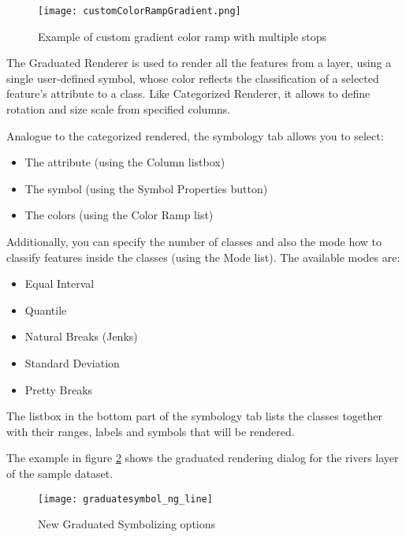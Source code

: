 \begin{figure}[ht]
   \centering
   \caption{Example of custom gradient color ramp with multiple stops \nixcaption}\label{fig:ccrg}
   \texttt{[image: customColorRampGradient.png]}
\end{figure}


The Graduated Renderer is used to render all the features from a layer, using
a single user-defined symbol, whose color reflects the classification of a selected
feature's attribute to a class. Like Categorized Renderer, it allows to define
rotation and size scale from specified columns.

Analogue to the categorized rendered, the symbology tab allows you to select:

\begin{itemize}[label=--]
\item The attribute (using the Column listbox)
\item The symbol (using the Symbol Properties button)
\item The colors (using the Color Ramp list)
\end{itemize}

Additionally, you can specify the number of classes and also the mode how to
classify features inside the classes (using the Mode list). The available modes are:
\begin{itemize}
 \item Equal Interval
 \item Quantile
 \item Natural Breaks (Jenks)
 \item Standard Deviation
 \item Pretty Breaks
\end{itemize}

The listbox in the  bottom part of the symbology tab lists the classes together with their ranges,
labels and symbols that will be rendered.

The example in figure \ref{fig:gradsymNG} shows the graduated rendering dialog
for the rivers layer of the \qg sample dataset.

\begin{figure}[ht]
   \centering
   \texttt{[image: graduatesymbol\_ng\_line]}
   \caption{New Graduated Symbolizing options \nixcaption}\label{fig:gradsymNG}
\end{figure}


